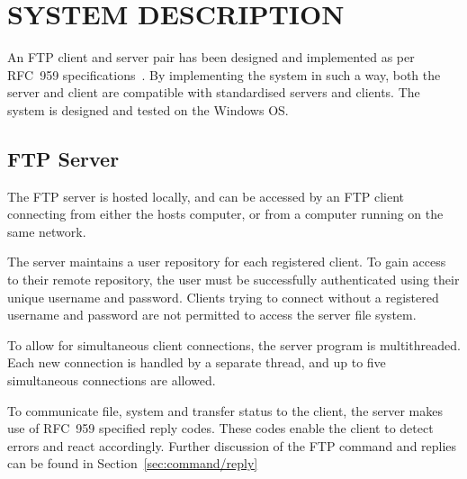 \documentclass[10pt,twocolumn]{witseiepaper}
\begin{document}


\section{SYSTEM DESCRIPTION} 

An FTP client and server pair has been designed and implemented as per RFC~959 specifications~\cite{rfc959}. By implementing the system in such a way, both the server and client are compatible with standardised servers and clients. The system is designed and tested on the  Windows OS.

\subsection{FTP Server}

The FTP server is hosted locally, and can be accessed by an FTP client connecting from either the hosts computer, or from a computer running on the same network. 

The server maintains a user repository for each registered client. To gain access to their remote repository, the user must be successfully authenticated using their unique username and password. Clients trying to connect without a registered username and password are not permitted to access the server file system.


To allow for simultaneous client connections, the server program is multithreaded. Each new connection is handled by a separate thread, and up to five simultaneous connections are allowed. 

To communicate file, system and transfer status to the client, the server makes use of RFC~959 specified reply codes. These codes enable the client to detect errors and react accordingly. Further discussion of the FTP command and replies can be found in Section~\ref{sec:command/reply}
\end{document}
